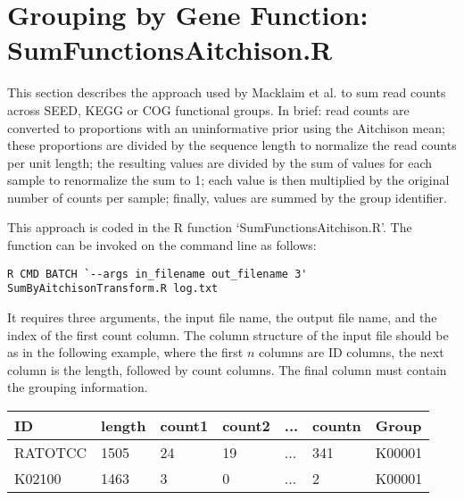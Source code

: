 \documentclass[11pt]{article}
\begin{document}
\section{Grouping by Gene Function: SumFunctionsAitchison.R}
This section describes the approach used by Macklaim et al.\cite{Macklaim:2013} to sum read counts across SEED, KEGG or COG functional groups. In brief: read counts are converted to proportions with an uninformative prior using the Aitchison mean\cite{Aitchison:1986}; these proportions are divided by the sequence length to normalize the read counts per unit length; the resulting values are divided by the sum of values for each sample to renormalize the sum to 1; each value is then multiplied by the original number of counts per sample; finally, values are summed by the group identifier. 

This approach is coded in the R function `SumFunctionsAitchison.R'. The function can be invoked on the command line as follows:
\begin{verbatim}
R CMD BATCH `--args in_filename out_filename 3' SumByAitchisonTransform.R log.txt 
\end{verbatim}
It requires three arguments, the input file name, the output file name, and the index of the first count column. The column structure of the input file should be as in the following example, where the first $n$ columns are ID columns, the next column is the length, followed by count columns. The final column must contain the grouping information.\\

\begin{tabular}{lllllll}
ID & length & count1 & count2 & ... & countn & Group\\\hline
RATOTCC & 1505 & 24 & 19 & ... & 341 & K00001\\
K02100 & 1463 & 3 & 0 & ... & 2 & K00001\\
\end{tabular}


\end{document}
